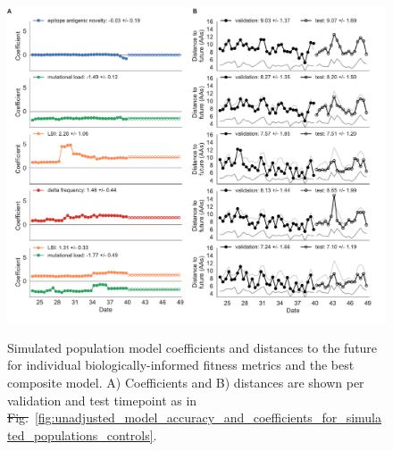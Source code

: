 \documentclass[9pt,lineno]{elife} %
\providecommand{\DIFadd}[1]{{\protect\color{blue}\uwave{#1}}} %
\providecommand{\DIFdel}[1]{{\protect\color{red}\sout{#1}}}                      %
\providecommand{\DIFaddFL}[1]{\DIFadd{#1}} %
\providecommand{\DIFdelFL}[1]{\DIFdel{#1}} %
\providecommand{\DIFaddbeginFL}{} %
\providecommand{\DIFaddendFL}{} %
\providecommand{\DIFdelbeginFL}{} %
\providecommand{\DIFdelendFL}{} %
\providecommand{\DIFaddtex}[1]{{\protect\color{blue}\uwave{#1}}} %
\providecommand{\DIFdeltex}[1]{{\protect\color{red}\sout{#1}}}                      %
\providecommand{\DIFaddFL}[1]{\DIFadd{#1}} %
\providecommand{\DIFdelFL}[1]{\DIFdel{#1}} %
\providecommand{\DIFaddbeginFL}{} %
\providecommand{\DIFaddendFL}{} %
\providecommand{\DIFdelbeginFL}{} %
\providecommand{\DIFdelendFL}{} %
\providecommand{\DIFadd}[1]{\texorpdfstring{\DIFaddtex{#1}}{#1}} %
\providecommand{\DIFdel}[1]{\texorpdfstring{\DIFdeltex{#1}}{}} %
\newcommand{\DIFscaledelfig}{0.5}
\newlength{\DIFdelgraphicswidth} %
\newlength{\DIFdelgraphicsheight} %
\newcommand{\DIFaddincludegraphics}[2][]{{\color{blue}\fbox{\DIFOincludegraphics[#1]{#2}}}} %
\newcommand{\DIFdelincludegraphics}[2][]{%
\sbox{\DIFdelgraphicsbox}{\DIFOincludegraphics[#1]{#2}}%
\settoboxwidth{\DIFdelgraphicswidth}{\DIFdelgraphicsbox} %
\settoboxtotalheight{\DIFdelgraphicsheight}{\DIFdelgraphicsbox} %
\scalebox{\DIFscaledelfig}{%
\parbox[b]{\DIFdelgraphicswidth}{\usebox{\DIFdelgraphicsbox}\\[-\baselineskip] \rule{\DIFdelgraphicswidth}{0em}}\llap{\resizebox{\DIFdelgraphicswidth}{\DIFdelgraphicsheight}{%
\setlength{\unitlength}{\DIFdelgraphicswidth}%
\begin{picture}(1,1)%
\thicklines\linethickness{2pt} %
{\color[rgb]{1,0,0}\put(0,0){\framebox(1,1){}}}%
{\color[rgb]{1,0,0}\put(0,0){\line( 1,1){1}}}%
{\color[rgb]{1,0,0}\put(0,1){\line(1,-1){1}}}%
\end{picture}%
}\hspace*{3pt}}} %
} %
\DeclareRobustCommand{\DIFaddbeginFL}{\DIFOaddbeginFL \let\includegraphics\DIFaddincludegraphics} %
\DeclareRobustCommand{\DIFaddendFL}{\DIFOaddendFL \let\includegraphics\DIFOincludegraphics} %
\DeclareRobustCommand{\DIFdelbeginFL}{\DIFOdelbeginFL \let\includegraphics\DIFdelincludegraphics} %
\DeclareRobustCommand{\DIFdelendFL}{\DIFOaddendFL \let\includegraphics\DIFOincludegraphics} %
\begin{document}
\begin{figure}[htb]
  \DIFdelbeginFL %
\DIFdelendFL \DIFaddbeginFL \includegraphics[width=\textwidth]{Figure_3.pdf}
  \DIFaddendFL \caption{
    Simulated population model coefficients and distances to the future for individual biologically-informed fitness metrics and the best composite model.
    A) Coefficients and B) distances are shown per validation and test timepoint as in \DIFdelbeginFL \DIFdelFL{Fig.}\DIFdelendFL \DIFaddbeginFL \DIFaddFL{Figure}\DIFaddendFL ~\ref{fig:unadjusted_model_accuracy_and_coefficients_for_simulated_populations_controls}.
  }
  \label{fig:unadjusted_model_accuracy_and_coefficients_for_simulated_populations}
\DIFdelbeginFL %
\DIFdelendFL \DIFaddbeginFL 

  \label{figsupp:unadjusted_composite_model_accuracy_and_coefficients_for_simulated_populations}


\end{figure}
\end{document}
